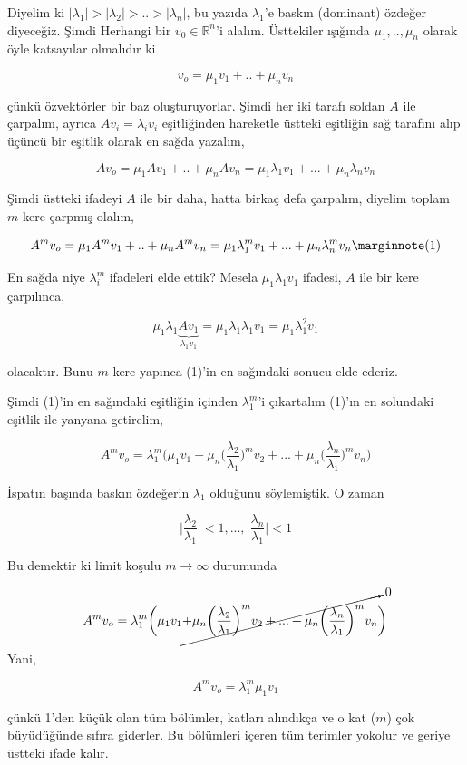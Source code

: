 \documentclass[12pt,fleqn]{article}\usepackage{../../common}
\begin{document}
Diyelim ki $|\lambda_1| > |\lambda_2| > .. > |\lambda_n|$, bu yazıda
$\lambda_1$'e baskın (dominant) özdeğer diyeceğiz. Şimdi Herhangi bir $v_0 \in
\mathbb{R}^n$'i alalım.  Üsttekiler ışığında $\mu_1,..,\mu_n$ olarak öyle
katsayılar olmalıdır ki

$$ v_o = \mu_1v_1 + .. + \mu_nv_n 
$$

çünkü özvektörler bir baz oluşturuyorlar. Şimdi her iki tarafı soldan $A$ ile
çarpalım, ayrıca $Av_i = \lambda_iv_i$ eşitliğinden hareketle üstteki eşitliğin
sağ tarafını alıp üçüncü bir eşitlik olarak en sağda yazalım,

$$ A v_o = \mu_1 A v_1 + .. + \mu_n A v_n =
\mu_1\lambda_1v_1 + ... + \mu_n\lambda_nv_n
$$

Şimdi üstteki ifadeyi $A$ ile bir daha, hatta birkaç defa çarpalım, diyelim
toplam $m$ kere çarpmış olalım,


$$
A^m v_o = \mu_1 A^m v_1 + .. + \mu_n A^m v_n =
\mu_1\lambda_1^mv_1 + ... + \mu_n\lambda_n^mv_n
\mlabel{1}
$$

En sağda niye $\lambda_i^m$ ifadeleri elde ettik? Mesela $\mu_1\lambda_1v_1$
ifadesi, $A$ ile bir kere çarpılınca,

$$
\mu_1\lambda_1\underbrace{Av_1}_{\lambda_1v_1} =
\mu_1\lambda_1\lambda_1v_1 = 
\mu_1\lambda_1^2v_1 
$$

olacaktır. Bunu $m$ kere yapınca (1)'in en sağındaki sonucu elde ederiz.

Şimdi (1)'in en sağındaki eşitliğin içinden $\lambda_1^m$'i çıkartalım (1)'ın en
solundaki eşitlik ile yanyana getirelim,

$$
A^m v_o = 
\lambda_1^m \bigg(  
\mu_1v_1 
+ \mu_n \bigg(\frac{\lambda_2}{\lambda_1}\bigg)^m v_2
+ ... 
+ \mu_n \bigg(\frac{\lambda_n}{\lambda_1}\bigg)^m v_n
\bigg)
$$

İspatın başında baskın özdeğerin $\lambda_1$ olduğunu söylemiştik. O zaman 

$$ 
\bigg| \frac{\lambda_2}{\lambda_1} \bigg| < 1, ..., 
\bigg| \frac{\lambda_n}{\lambda_1} \bigg| < 1
 $$

Bu demektir ki limit koşulu $m \to \infty$ durumunda

$$
A^m v_o = 
\lambda_1^m \bigg(  
\mu_1v_1 
\cancelto{0}
{
+ \mu_n \bigg(\frac{\lambda_2}{\lambda_1}\bigg)^m v_2
+ ... 
+ \mu_n \bigg(\frac{\lambda_n}{\lambda_1}\bigg)^m v_n
}
\bigg)
$$

Yani,

$$
A^m v_o = \lambda_1^m  \mu_1v_1 
$$

çünkü 1'den küçük olan tüm bölümler, katları alındıkça ve o kat ($m$) çok
büyüdüğünde sıfıra giderler. Bu bölümleri içeren tüm terimler yokolur ve geriye
üstteki ifade kalır.
\end{document}
